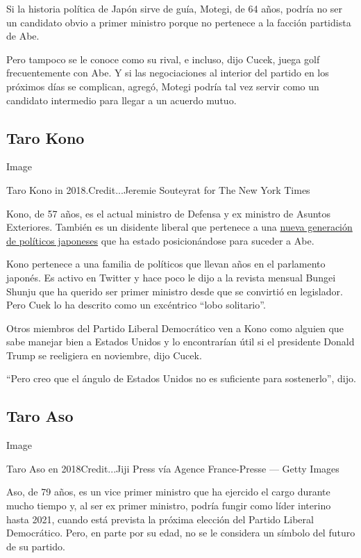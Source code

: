 Si la historia política de Japón sirve de guía, Motegi, de 64 años,
podría no ser un candidato obvio a primer ministro porque no pertenece a
la facción partidista de Abe.

Pero tampoco se le conoce como su rival, e incluso, dijo Cucek, juega
golf frecuentemente con Abe. Y si las negociaciones al interior del
partido en los próximos días se complican, agregó, Motegi podría tal vez
servir como un candidato intermedio para llegar a un acuerdo mutuo.

\hypertarget{taro-kono}{%
\subsection{Taro Kono}\label{taro-kono}}

Image

Taro Kono in 2018.Credit...Jeremie Souteyrat for The New York Times

Kono, de 57 años, es el actual ministro de Defensa y ex ministro de
Asuntos Exteriores. También es un disidente liberal que pertenece a una
\href{https://www.nytimes3xbfgragh.onion/2018/02/17/world/asia/japan-taro-kono-political-maverick.html?searchResultPosition=1}{nueva
generación de políticos japoneses} que ha estado posicionándose para
suceder a Abe.

Kono pertenece a una familia de políticos que llevan años en el
parlamento japonés. Es activo en Twitter y hace poco le dijo a la
revista mensual Bungei Shunju que ha querido ser primer ministro desde
que se convirtió en legislador. Pero Cuek lo ha descrito como un
excéntrico ``lobo solitario''.

Otros miembros del Partido Liberal Democrático ven a Kono como alguien
que sabe manejar bien a Estados Unidos y lo encontrarían útil si el
presidente Donald Trump se reeligiera en noviembre, dijo Cucek.

``Pero creo que el ángulo de Estados Unidos no es suficiente para
sostenerlo'', dijo.

\hypertarget{taro-aso}{%
\subsection{Taro Aso}\label{taro-aso}}

Image

Taro Aso en 2018Credit...Jiji Press vía Agence France-Presse --- Getty
Images

Aso, de 79 años, es un vice primer ministro que ha ejercido el cargo
durante mucho tiempo y, al ser ex primer ministro, podría fungir como
líder interino hasta 2021, cuando está prevista la próxima elección del
Partido Liberal Democrático. Pero, en parte por su edad, no se le
considera un símbolo del futuro de su partido.

